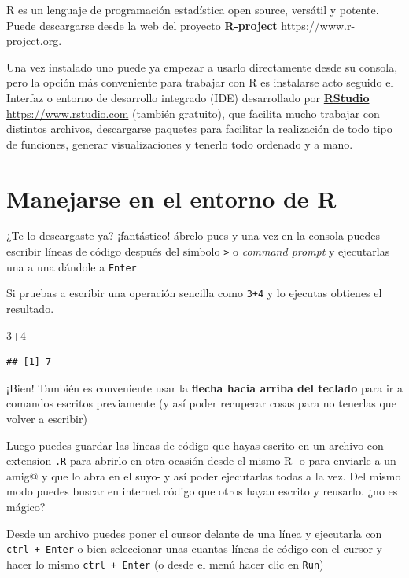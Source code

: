 \documentclass[]{book}
\newenvironment{Shaded}{\begin{snugshade}}{\end{snugshade}}
\newcommand{\DecValTok}[1]{\textcolor[rgb]{0.00,0.00,0.81}{{#1}}}
\theoremstyle{definition}
\theoremstyle{definition}
\theoremstyle{remark}
\begin{document}
R \citep{R-r} es un lenguaje de programación estadística open source,
versátil y potente. Puede descargarse desde la web del proyecto
\href{https://www.r-project.org}{\textbf{R-project}}
\url{https://www.r-project.org}.

Una vez instalado uno puede ya empezar a usarlo directamente desde su
consola, pero la opción más conveniente para trabajar con R es
instalarse acto seguido el Interfaz o entorno de desarrollo integrado
(IDE) desarrollado por \href{https://www.rstudio.com}{\textbf{RStudio}}
\url{https://www.rstudio.com} (también gratuito), que facilita mucho
trabajar con distintos archivos, descargarse paquetes para facilitar la
realización de todo tipo de funciones, generar visualizaciones y tenerlo
todo ordenado y a mano.

\section{Manejarse en el entorno de
R}\label{manejarse-en-el-entorno-de-r}

¿Te lo descargaste ya? ¡fantástico! ábrelo pues y una vez en la consola
puedes escribir líneas de código después del símbolo
\texttt{\textgreater{}} o \emph{command prompt} y ejecutarlas una a una
dándole a \texttt{Enter}

Si pruebas a escribir una operación sencilla como \texttt{3+4} y lo
ejecutas obtienes el resultado.

\begin{Shaded}
\begin{Highlighting}[]
\DecValTok{3+4}
\end{Highlighting}
\end{Shaded}

\begin{verbatim}
## [1] 7
\end{verbatim}

¡Bien! También es conveniente usar la \textbf{flecha hacia arriba del
teclado} para ir a comandos escritos previamente (y así poder recuperar
cosas para no tenerlas que volver a escribir)

Luego puedes guardar las líneas de código que hayas escrito en un
archivo con extension \texttt{.R} para abrirlo en otra ocasión desde el
mismo R -o para enviarle a un amig@ y que lo abra en el suyo- y así
poder ejecutarlas todas a la vez. Del mismo modo puedes buscar en
internet código que otros hayan escrito y reusarlo. ¿no es mágico?

Desde un archivo puedes poner el cursor delante de una línea y
ejecutarla con \texttt{ctrl\ +\ Enter} o bien seleccionar unas cuantas
líneas de código con el cursor y hacer lo mismo \texttt{ctrl\ +\ Enter}
(o desde el menú hacer clic en \texttt{Run})
\end{document}
